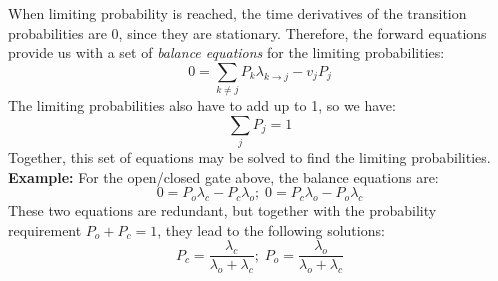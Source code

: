 \documentclass[11pt]{book}
\begin{document}
When limiting probability is reached, the time derivatives of the transition probabilities are 0, since they are stationary. Therefore, the forward  equations provide us with a set of \emph{balance equations} for the limiting probabilities:
$$ 0 =  \sum_{k \neq j}P_{k} \lambda_{k \rightarrow j}  - v_j P_{ j}$$
The limiting probabilities also have to add up to 1, so we have:
$$ \sum_j P_{j} = 1$$
Together, this set of equations may be solved to find the limiting probabilities. \\
\textbf{Example:} For the open/closed gate above, the balance equations are:
$$ 0 = P_o \lambda_c - P_c \lambda_o; \;  0 =  P_c \lambda_o - P_o \lambda_c $$
These two equations are redundant, but together with the probability requirement $P_o + P_c = 1$, they lead to the following solutions:
$$ P_c = \frac{\lambda_c}{\lambda_o  + \lambda_c}; \; P_o =  \frac{\lambda_o}{\lambda_o  + \lambda_c} $$
\end{document}
